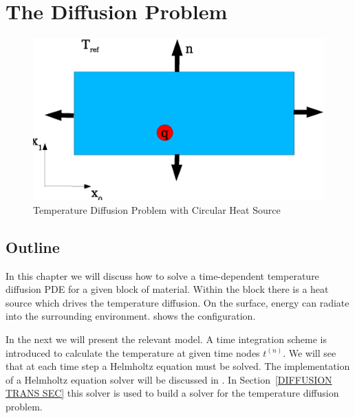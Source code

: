 
%
%
%


\section{The Diffusion Problem}
\label{DIFFUSION CHAP}

\begin{figure}
\centerline{\includegraphics[width=\figwidth]{DiffusionDomain}}
\caption{Temperature Diffusion Problem with Circular Heat Source}
\label{DIFFUSION FIG 1}
\end{figure}

\subsection{\label{DIFFUSION OUT SEC}Outline}
In this chapter we will discuss how to solve a time-dependent temperature
diffusion PDE for a given block of material.
Within the block there is a heat source which drives the temperature diffusion.
On the surface, energy can radiate into the surrounding environment.
 shows the configuration.

In the next  we will present the relevant model.
A time integration scheme is introduced to calculate the temperature at given time nodes $t^{(n)}$.
We will see that at each time step a Helmholtz equation must be solved. 
The implementation of a Helmholtz equation solver will be discussed in . 
In Section~\ref{DIFFUSION TRANS SEC} this solver is used to build a solver for
the temperature diffusion problem.

